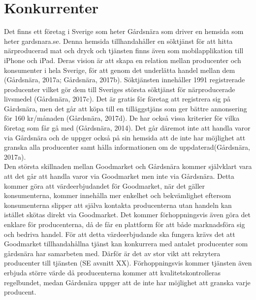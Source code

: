 \documentclass[10pt,a4paper,oneside]{article}
\begin{document}
\section{Konkurrenter}
Det finns ett företag i Sverige som heter Gårdsnära som driver en hemsida som heter gardsnara.se. Denna hemsida tillhandahåller en söktjänst för att hitta närproducerad mat och dryck och tjänsten finns även som mobilapplikation till iPhone och iPad. Deras vision är att skapa en relation mellan producenter och konsumenter i hela Sverige, för att genom det underlätta handel mellan dem (Gårdsnära, 2017a; Gårdsnära, 2017b). Söktjänsten innehåller 1991 registrerade producenter vilket gör dem till Sveriges största söktjänst för närproducerade livsmedel (Gårdsnära, 2017c). Det är gratis för företag att registrera sig på Gårdsnära, men det går att köpa till en tilläggstjäns som ger bättre annonsering för 160 kr/månaden (Gårdsnära, 2017d). De har också vissa kriterier för vilka företag som får gå med (Gårdsnära, 2014). Det går däremot inte att handla varor via Gårdsnära och de uppger också på sin hemsida att de inte har möjlighet att granska alla producenter samt hålla informationen om de uppdaterad(Gårdsnära, 2017a).\\

Den största skillnaden mellan Goodmarket och Gårdsnära kommer självklart vara att det går att handla varor via Goodmarket men inte via Gårdsnära. Detta kommer göra att värdeerbjudandet för Goodmarket, när det gäller konsumenterna, kommer innehålla mer enkelhet och bekvämlighet eftersom konsumenterna slipper att själva kontakta producenterna utan handeln kan istället skötas direkt via Goodmarket. Det kommer förhoppningsvis även göra det enklare för producenterna, då de får en plattform för att både marknadsföra sig och bedriva handel. För att detta värdeerbjudande ska fungera krävs det att Goodmarket tillhandahållna tjänst kan konkurrera med antalet producenter som gårdsnära har samarbeten med. Därför är det av stor vikt att rekrytera producenter till tjänsten (SE avsnitt XX). Förhoppningsvis kommer tjänsten även erbjuda större värde då producenterna kommer att kvalitetskontrolleras regelbundet, medan Gårdsnära uppger att de inte har möjlighet att granska varje producent.\\
\end{document}
